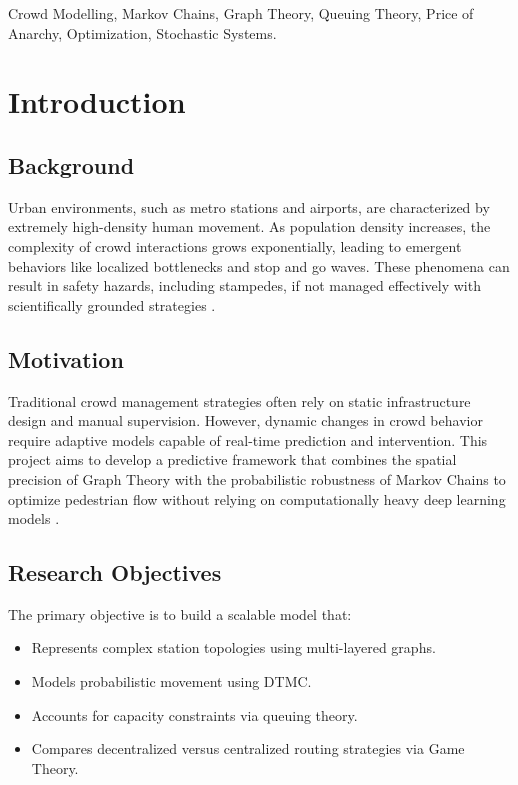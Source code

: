 \documentclass[conference]{IEEEtran}
\begin{document}
\begin{IEEEkeywords}
Crowd Modelling, Markov Chains, Graph Theory, Queuing Theory, Price of Anarchy, Optimization, Stochastic Systems.
\end{IEEEkeywords}

\section{Introduction}

\subsection{Background}
Urban environments, such as metro stations and airports, are characterized by extremely high-density human movement. As population density increases, the complexity of crowd interactions grows exponentially, leading to emergent behaviors like localized bottlenecks and stop and go waves. These phenomena can result in safety hazards, including stampedes, if not managed effectively with scientifically grounded strategies \cite{b1}.

\subsection{Motivation}
Traditional crowd management strategies often rely on static infrastructure design and manual supervision. However, dynamic changes in crowd behavior require adaptive models capable of real-time prediction and intervention. This project aims to develop a predictive framework that combines the spatial precision of Graph Theory with the probabilistic robustness of Markov Chains to optimize pedestrian flow without relying on computationally heavy deep learning models \cite{b6}.

\subsection{Research Objectives}
The primary objective is to build a scalable model that:
\begin{itemize}
    \item Represents complex station topologies using multi-layered graphs.
    \item Models probabilistic movement using DTMC.
    \item Accounts for capacity constraints via queuing theory.
    \item Compares decentralized versus centralized routing strategies via Game Theory.
\end{itemize}
\end{document}
